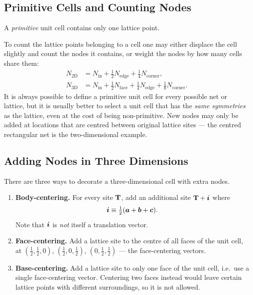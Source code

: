 \subsection{Primitive Cells and Counting Nodes}

\begin{definition}
A \emph{primitive} unit cell contains only one lattice point.
\end{definition}

To count the lattice points belonging to a cell one may either displace the cell slightly and count the nodes it contains, or weight the nodes by how many cells share them:
\begin{align}
    N_{2\mathrm{D}} &= N_{\text{in}} + \tfrac{1}{2}N_{\text{edge}} + \tfrac{1}{4}N_{\text{corner}}, \\
    N_{3\mathrm{D}} &= N_{\text{in}} + \tfrac{1}{2}N_{\text{face}} + \tfrac{1}{4}N_{\text{edge}} + \tfrac{1}{8}N_{\text{corner}} .
\end{align}
It is always possible to define a primitive unit cell for every possible net or lattice, but it is usually better to select a unit cell that has the \emph{same symmetries} as the lattice, even at the cost of being non-primitive. New nodes may only be added at locations that are centred between original lattice sites --- the centred rectangular net is the two-dimensional example.

\subsection{Adding Nodes in Three Dimensions}

There are three ways to decorate a three-dimensional cell with extra nodes.

\begin{enumerate}
    \item \textbf{Body-centering.} For every site $\cvect{T}$, add an additional site $\cvect{T} + \lvect{i}$ where
    \begin{equation}
        \bm{i} \equiv \tfrac{1}{2}(\bm{a} + \bm{b} + \bm{c}).
    \end{equation}
    Note that $\bm{i}$ is \emph{not} itself a translation vector.
    \item \textbf{Face-centering.} Add a lattice site to the centre of all faces of the unit cell, at $(\tfrac12,\tfrac12,0)$, $(\tfrac12,0,\tfrac12)$, $(0,\tfrac12,\tfrac12)$ --- the face-centering vectors.
    \item \textbf{Base-centering.} Add a lattice site to only one face of the unit cell, i.e.\ use a single face-centering vector. Centering two faces instead would leave certain lattice points with different surroundings, so it is not allowed.
\end{enumerate}


